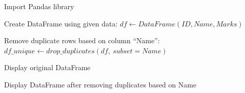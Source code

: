 \begin{algorithm}
\caption{Remove Duplicate Rows Based on a Specific Column in a DataFrame}
\begin{algorithmic}[1]

\STATE Import Pandas library

\STATE Create DataFrame using given data:
\STATE $df \gets DataFrame(ID, Name, Marks)$

\STATE Remove duplicate rows based on column ``Name'':
\STATE $df\_unique \gets drop\_duplicates(df,\ subset = Name)$

\STATE Display original DataFrame

\STATE Display DataFrame after removing duplicates based on Name

\end{algorithmic}
\end{algorithm}